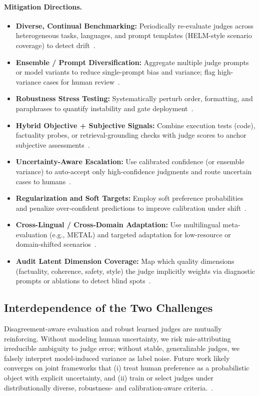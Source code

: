 \paragraph{Mitigation Directions.}
\begin{itemize}
	\item \textbf{Diverse, Continual Benchmarking:} Periodically re-evaluate judges across heterogeneous tasks, languages, and prompt templates (HELM-style scenario coverage) to detect drift~\cite{liang2022helm, hada2024metal}.
	\item \textbf{Ensemble / Prompt Diversification:} Aggregate multiple judge prompts or model variants to reduce single-prompt bias and variance; flag high-variance cases for human review~\cite{li2024_llmsasjudges, zheng2023judgelm}.
	\item \textbf{Robustness Stress Testing:} Systematically perturb order, formatting, and paraphrases to quantify instability and gate deployment~\cite{zheng2023judgelm, li2024_llmsasjudges}.
	\item \textbf{Hybrid Objective + Subjective Signals:} Combine execution tests (code), factuality probes, or retrieval-grounding checks with judge scores to anchor subjective assessments~\cite{chen2021evaluating, liang2022helm}.
	\item \textbf{Uncertainty-Aware Escalation:} Use calibrated confidence (or ensemble variance) to auto-accept only high-confidence judgments and route uncertain cases to humans~\cite{guo2017calibration, brier1950verification}.
	\item \textbf{Regularization and Soft Targets:} Employ soft preference probabilities and penalize over-confident predictions to improve calibration under shift~\cite{stiennon2020learning, ouyang2022training, niculescu2005predicting}.
	\item \textbf{Cross-Lingual / Cross-Domain Adaptation:} Use multilingual meta-evaluation (e.g., METAL) and targeted adaptation for low-resource or domain-shifted scenarios~\cite{hada2024metal, kocmi2023llmmt}.
	\item \textbf{Audit Latent Dimension Coverage:} Map which quality dimensions (factuality, coherence, safety, style) the judge implicitly weights via diagnostic prompts or ablations to detect blind spots~\cite{li2024_llmsasjudges, liang2022helm}.
\end{itemize}

\subsection{Interdependence of the Two Challenges}
Disagreement-aware evaluation and robust learned judges are mutually reinforcing. Without modeling human uncertainty, we risk mis-attributing irreducible ambiguity to judge error; without stable, generalizable judges, we falsely interpret model-induced variance as label noise. Future work likely converges on joint frameworks that (i) treat human preference as a probabilistic object with explicit uncertainty, and (ii) train or select judges under distributionally diverse, robustness- and calibration-aware criteria.~\cite{li2024_llmsasjudges, liang2022helm, bavaresco2024judgebench}.